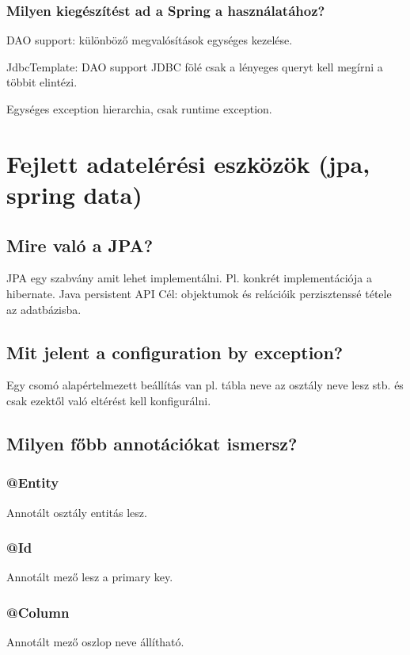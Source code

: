 \documentclass[a4paper,14pt]{extarticle}
\begin{document}
			\subsubsection{Milyen kiegészítést ad a Spring a használatához?}
			\begin{compactitem}
				\item DAO support: különböző megvalósítások egységes kezelése.
				\item JdbcTemplate: DAO support JDBC fölé csak a lényeges queryt kell megírni a többit elintézi.
				\item Egységes exception hierarchia, csak runtime exception.
			\end{compactitem}
	
	\section{Fejlett adatelérési eszközök (jpa, spring data)}
		\subsection{Mire való a JPA?}
		JPA egy szabvány amit lehet implementálni. Pl. konkrét implementációja a hibernate.
		Java persistent API
		\newline
		Cél: objektumok és relációik perzisztenssé tétele az adatbázisba. 
		\subsection{Mit jelent a configuration by exception?}
		Egy csomó alapértelmezett beállítás van pl. tábla neve az osztály neve lesz stb. és csak ezektől való eltérést kell konfigurálni.
		\subsection{Milyen főbb annotációkat ismersz?}
			\subsubsection{@Entity} Annotált osztály entitás lesz.
			\subsubsection{@Id} Annotált mező lesz a primary key.
			\subsubsection{@Column} Annotált mező  oszlop neve állítható.
\end{document}
